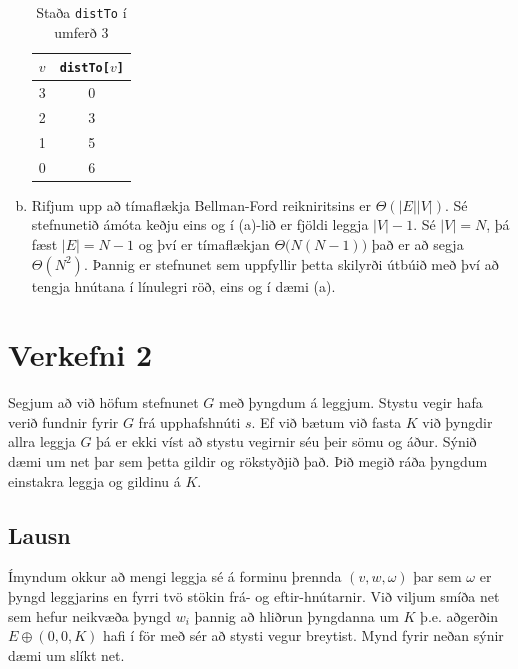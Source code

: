 \documentclass[12pt, a4paper, hidelinks]{article}
\begin{document}
\begin{enumerate}[(a)]
    \begin{table}[H]
        \centering
        \caption{Staða \texttt{distTo} í umferð 3}
        \begin{tabular}{lc}
            \toprule
            $v$ & \texttt{distTo[$v$]} \\
            \midrule
            3   & 0        \\
            2   & 3         \\
            1   & 5 \\
            0   & 6 \\
            \bottomrule
        \end{tabular}
        \label{tab:my_label}
    \end{table}
    
    \item Rifjum upp að tímaflækja Bellman-Ford reikniritsins er $\Theta(|E||V|)$. Sé stefnunetið ámóta keðju eins og í (a)-lið er fjöldi leggja $|V| - 1$. Sé $|V| = N$, þá fæst $|E| = N - 1$ og því er tímaflækjan
    $\Theta\big(N(N - 1)\big)$ það er að segja $\Theta(N^2)$. Þannig er stefnunet sem uppfyllir þetta skilyrði útbúið með því að tengja hnútana í línulegri röð, eins og í dæmi (a).
\end{enumerate}

\newpage

\section*{Verkefni 2}
Segjum að við höfum stefnunet $G$ með þyngdum á leggjum. Stystu vegir hafa verið fundnir fyrir $G$ frá upphafshnúti $s$. Ef við bætum við fasta $K$ við þyngdir allra leggja $G$ þá er ekki víst að stystu vegirnir séu þeir sömu og áður. Sýnið dæmi um net þar sem þetta gildir og rökstyðjið það. Þið megið ráða þyngdum einstakra leggja og gildinu á $K$.

\subsection*{Lausn}
Ímyndum okkur að mengi leggja sé á forminu þrennda $(v, w, \omega)$ þar sem $\omega$ er þyngd leggjarins en fyrri tvö stökin frá- og eftir-hnútarnir. Við viljum smíða net sem hefur neikvæða þyngd $w_i$ þannig að hliðrun þyngdanna um $K$ þ.e. aðgerðin $E \oplus (0, 0, K)$ hafi í för með sér að stysti vegur breytist. Mynd fyrir neðan sýnir dæmi um slíkt net.
\end{document}
